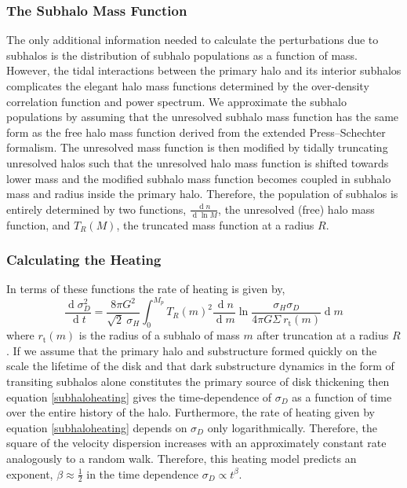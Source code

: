 \documentclass[usenatbib]{mnras}
\renewcommand{\d}[1]{\! \mathrm{d}#1 \:}
\newcommand{\deriv}[2]{\frac{\d{#1}}{\d{#2}}}
\renewcommand{\d}[1]{\ensuremath{\operatorname{d}\!{#1}}}
\begin{document}
\subsubsection{The Subhalo Mass Function}

The only additional information needed to calculate the perturbations due to subhalos is the distribution of subhalo populations as a function of mass. However, the tidal interactions between the primary halo and its interior subhalos complicates the elegant halo mass functions determined by the over-density correlation function and power spectrum. We approximate the subhalo populations by assuming that the unresolved subhalo mass function has the same form as the free halo mass function derived from the extended Press--Schechter formalism. The unresolved mass function is then modified by tidally truncating unresolved halos such that the unresolved halo mass function is shifted towards lower mass and the modified subhalo mass function becomes coupled in subhalo mass and radius inside the primary halo. Therefore, the population of subhalos is entirely determined by two functions, $\frac{\d{n}}{\d{\ln{M}}}$, the unresolved (free) halo mass function, and $T_R(M)$, the truncated mass function at a radius $R$.

\subsubsection{Calculating the Heating}

In terms of these functions the rate of heating is given by,
\begin{equation} \label{subhaloheating}
\deriv{\sigma_D^2}{t} = \frac{8 \pi G^2}{\sqrt{2} \: \sigma_H} \int_0^{M_p} T_R(m)^2  \deriv{n}{m}  \ln{\frac{\sigma_H \sigma_D}{4 \pi G \Sigma \: r_{\text{t}}(m)}} \d{m}
\end{equation}   
where $r_{\text{t}}(m)$ is the radius of a subhalo of mass $m$ after truncation at a radius $R$. 
If we assume that the primary halo and substructure formed quickly on the scale the lifetime of the disk and that dark substructure dynamics in the form of transiting subhalos alone constitutes the primary source of disk thickening then equation \ref{subhaloheating} gives the time-dependence of $\sigma_D$ as a function of time over the entire history of the halo. Furthermore, the rate of heating given by equation \ref{subhaloheating} depends on $\sigma_D$ only logarithmically. Therefore, the square of the velocity dispersion increases with an approximately constant rate analogously to a random walk. Therefore, this heating model predicts an exponent, $\beta \approx \tfrac{1}{2}$ in the time dependence $\sigma_D \propto t^{\beta}$.
\end{document}
